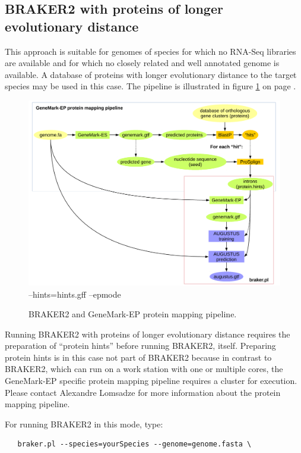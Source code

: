 \documentclass[a4paper,10pt]{report}
\begin{document}
\subsection{BRAKER2 with proteins of longer evolutionary distance}

This approach is suitable for genomes of species for which no RNA-Seq libraries are available and for which no closely related and well annotated genome is available. A database of proteins with longer evolutionary distance to the target species may be used in this case. The pipeline is illustrated in figure \ref{gatech} on page \pageref{gatech}.

\begin{figure}
 \centering
 \includegraphics[scale=0.4]{./figs/gatech-prot-pipeline.pdf}
 --hints=hints.gff --epmode
 \caption{BRAKER2 and GeneMark-EP protein mapping pipeline.}
 \label{gatech}
\end{figure}

Running BRAKER2 with proteins of longer evolutionary distance requires the preparation of ``protein hints'' before running BRAKER2, itself. Preparing protein hints is in this case not part of BRAKER2 because in contrast to BRAKER2, which can run on a work station with one or multiple cores, the GeneMark-EP specific protein mapping pipeline requires a cluster for execution. Please contact Alexandre Lomsadze for more information about the protein mapping pipeline.

For running BRAKER2 in this mode, type:

\begin{verbatim}
   braker.pl --species=yourSpecies --genome=genome.fasta \
\end{verbatim}
\end{document}
